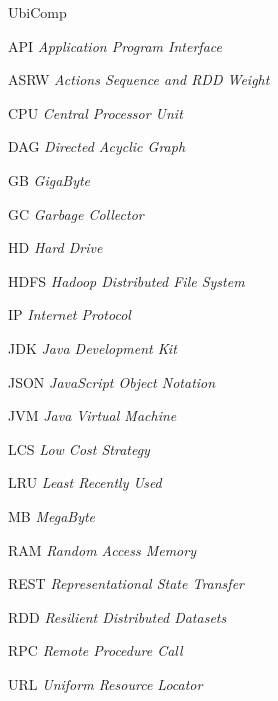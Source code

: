 \begin{listofabbrv}{UbiComp}
      \item[API]    \textit{Application Program Interface} 
      \item[ASRW]   \textit{Actions Sequence and RDD Weight}
      \item[CPU]    \textit{Central Processor Unit} 
      \item[DAG]    \textit{Directed Acyclic Graph} 
      \item[GB]     \textit{GigaByte} 
      \item[GC]     \textit{Garbage Collector} 
      \item[HD]     \textit{Hard Drive}
      \item[HDFS]   \textit{Hadoop Distributed File System} 
      \item[IP]     \textit{Internet Protocol} 
      \item[JDK]    \textit{Java Development Kit}
      \item[JSON]   \textit{JavaScript Object Notation}
      \item[JVM]    \textit{Java Virtual Machine} 
      \item[LCS]    \textit{Low Cost Strategy} 
      \item[LRU]    \textit{Least Recently Used}
      \item[MB]     \textit{MegaByte}
      \item[RAM]    \textit{Random Access Memory} 
      \item[REST]   \textit{Representational State Transfer} 
      \item[RDD]    \textit{Resilient Distributed Datasets} 
      \item[RPC]    \textit{Remote Procedure Call} 
      \item[URL]    \textit{Uniform Resource Locator} 
\end{listofabbrv}